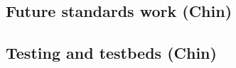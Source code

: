 \documentclass[conference]{IEEEtran}
\begin{document}
\subsection{Future standards work (Chin)}
\subsection{Testing and testbeds (Chin)}


%


%



%
\end{document}
